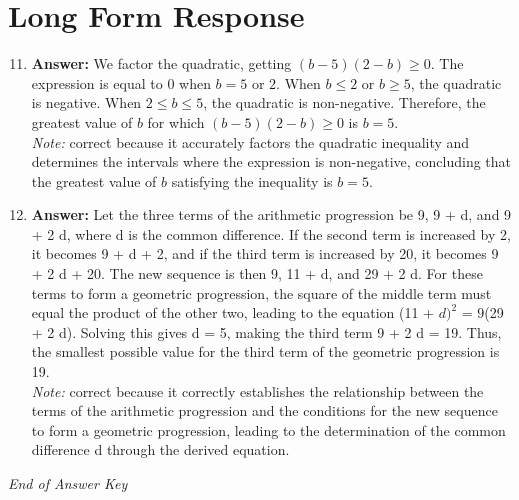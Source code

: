 \documentclass[12pt]{article}
\begin{document}
\section*{Long Form Response}
\begin{enumerate}[label=\arabic*.]
\setcounter{enumi}{10}
\item \textbf{Answer:} We factor the quadratic, getting $(b-5)(2-b) \ge 0$. The expression is equal to $0$ when $b=5 \text{ or } 2$. When $b \le 2$ or $b \ge 5$, the quadratic is negative. When $2 \le b \le 5$, the quadratic is non-negative. Therefore, the greatest value of $b$ for which $(b-5)(2-b)\ge 0$ is $b=\boxed{5}$.
\\ \textit{Note:} correct because it accurately factors the quadratic inequality and determines the intervals where the expression is non-negative, concluding that the greatest value of \( b \) satisfying the inequality is \( b = 5 \).
\item \textbf{Answer:} Let the three terms of the arithmetic progression be 9, 9 + d, and 9 + 2 d, where d is the common difference. If the second term is increased by 2, it becomes 9 + d + 2, and if the third term is increased by 20, it becomes 9 + 2 d + 20. The new sequence is then 9, 11 + d, and 29 + 2 d. For these terms to form a geometric progression, the square of the middle term must equal the product of the other two, leading to the equation (11 + $d)^2$ = 9(29 + 2 d). Solving this gives d = 5, making the third term 9 + 2 d = 19. Thus, the smallest possible value for the third term of the geometric progression is 19.
\\ \textit{Note:} correct because it correctly establishes the relationship between the terms of the arithmetic progression and the conditions for the new sequence to form a geometric progression, leading to the determination of the common difference d through the derived equation.
\end{enumerate}

\vfill
\noindent\textit{End of Answer Key}
\end{document}
